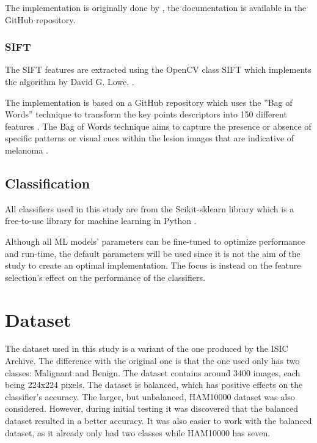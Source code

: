 \documentclass{kththesis}
\begin{document}
The implementation is originally done by \parencite{melanoma-classifier}, the documentation is available in the GitHub repository.




\subsubsection{SIFT}

The SIFT features are extracted using the OpenCV class SIFT which implements the algorithm by David G. Lowe. \parencite{sift-opencv} \parencite{lowe2004distinctive}.

The implementation is based on a GitHub repository which uses the ''Bag of Words'' technique to transform the key points descriptors into 150 different features \parencite{SIFT-repo}. The Bag of Words technique aims to capture the presence or absence of specific patterns or visual cues within the lesion images that are indicative of melanoma \parencite{9960177}.


\subsection{Classification}

All classifiers used in this study are from the Scikit-sklearn library which is a free-to-use library for machine learning in Python \parencite{scikit-learn-doc}.

Although all ML models’ parameters can be fine-tuned to optimize performance and run-time, the default parameters will be used since it is not the aim of the study to create an optimal implementation. The focus is instead on the feature selection’s effect on the performance of the classifiers.


\section{Dataset}

The dataset used in this study is a variant of the one produced by the ISIC Archive. The difference with the original one is that the one used only has two classes: Malignant and Benign. The dataset contains around 3400 images, each being 224x224 pixels. The dataset is balanced, which has positive effects on the classifier's accuracy. The larger, but unbalanced, HAM10000 dataset was also considered. However, during initial testing it was discovered that the balanced dataset resulted in a better accuracy. It was also easier to work with the balanced dataset, as it already only had two classes while HAM10000 has seven.
\end{document}
